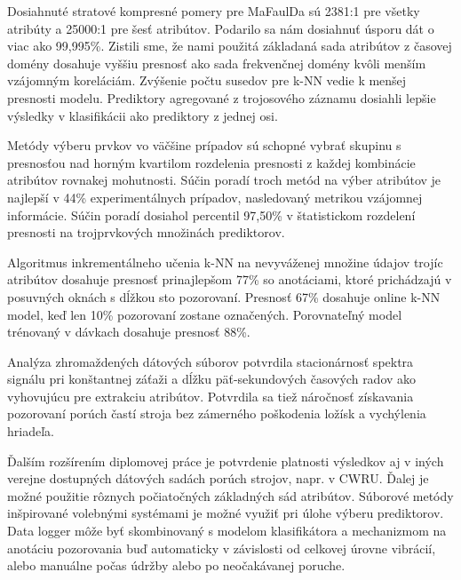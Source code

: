 Dosiahnuté stratové kompresné pomery pre MaFaulDa sú 2381:1 pre všetky atribúty a 25000:1 pre šesť atribútov. Podarilo sa nám dosiahnuť úsporu dát o viac ako 99,995\%. Zistili sme, že nami použitá základaná sada atribútov z časovej domény dosahuje vyššiu presnosť ako sada frekvenčnej domény kvôli menším vzájomným koreláciám. Zvýšenie počtu susedov pre k-NN vedie k menšej presnosti modelu. Prediktory agregované z trojosového záznamu dosiahli lepšie výsledky v klasifikácii ako prediktory z jednej osi. 

Metódy výberu prvkov vo väčšine prípadov sú schopné vybrať skupinu s presnosťou nad horným kvartilom rozdelenia presnosti z každej kombinácie atribútov rovnakej mohutnosti. Súčin poradí troch metód na výber atribútov je najlepší v 44\% experimentálnych prípadov, nasledovaný metrikou vzájomnej informácie. Súčin poradí dosiahol percentil 97,50\% v štatistickom rozdelení presnosti na trojprvkových množinách prediktorov.

Algoritmus inkrementálneho učenia k-NN na nevyváženej množine údajov trojíc atribútov dosahuje presnosť prinajlepšom 77\% so anotáciami, ktoré prichádzajú v posuvných oknách s dĺžkou sto pozorovaní. Presnosť 67\% dosahuje online k-NN model, keď len 10\% pozorovaní zostane označených. Porovnateľný model trénovaný v dávkach dosahuje presnosť 88\%.

Analýza zhromaždených dátových súborov potvrdila stacionárnosť spektra signálu pri konštantnej záťaži a dĺžku päť-sekundových časových radov ako vyhovujúcu pre extrakciu atribútov. Potvrdila sa tiež náročnosť získavania pozorovaní porúch častí stroja bez zámerného poškodenia ložísk a vychýlenia hriadeľa.

Ďalším rozšírením diplomovej práce je potvrdenie platnosti výsledkov aj v iných verejne dostupných dátových sadách porúch strojov, napr. v CWRU. Ďalej je možné použitie rôznych počiatočných základných sád atribútov. Súborové metódy inšpirované volebnými systémami je možné využiť pri úlohe výberu prediktorov. Data logger môže byť skombinovaný s modelom klasifikátora a mechanizmom na anotáciu pozorovania buď automaticky v závislosti od celkovej úrovne vibrácií, alebo manuálne počas údržby alebo po neočakávanej poruche.
\clearpage